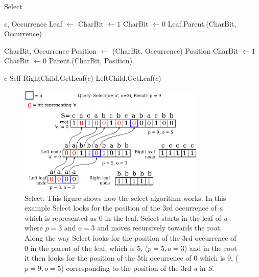 \begin{algorithm}
\caption{Select}
\label{alg:select}
\begin{algorithmic} 
 {$c$, Occurrence}
\State Leaf $\gets$ 
	\State CharBit $\gets 1$
\Else
	\State CharBit $\gets 0$
\EndIf
\State \Return Leaf.Parent.(CharBit, Occurrence)
\EndFunction

\vspace{5mm}

 {CharBit, Occurrence}
\State Position $\gets$ (CharBit, Occurrence)
	\State \Return Position
\EndIf
{}
	\State CharBit $\gets 1$
\Else
	\State CharBit $\gets 0$
\EndIf
\State \Return Parent.(CharBit, Position)
\EndFunction

\vspace{5mm}

 {$c$}
	\State \Return Self
\EndIf
{}
	\State \Return RightChild.GetLeaf($c$)
\Else
	\State \Return LeftChild.GetLeaf($c$)
\EndIf
\EndFunction
\end{algorithmic}
\end{algorithm}

\begin{figure}
\center \includegraphics[width=0.8\textwidth]{SelectDrawing}
\caption{Select: This figure shows how the select algorithm works. 
In this example Select looks for the position of the 3rd occurrence of \textit{a} which is represented as 0 in the leaf.
Select starts in the leaf of \textit{a} where $p = 3$ and $o = 3$ and moves recursively towards the root. Along the way Select looks for the position of the 3rd occurrence of 0 in the parent of the leaf, which is 5, ($p=5, o=3$) and in the root it then looks for the position of the 5th occurrence of 0 which is 9, ($p=9, o=5$)  corresponding to the position of the 3rd \textit{a} in \textit{S}.}
\label{fig:SelectDrawing}
\end{figure}

